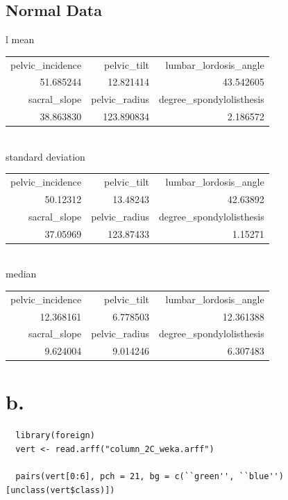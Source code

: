 \documentclass{report}
\begin{document}
\subsection{Normal Data}

\begin{tabular}{l}
  mean \\
  \hskip 1.0cm\begin{tabular}{rrr}
    pelvic\_incidence & pelvic\_tilt & lumbar\_lordosis\_angle \\
    51.685244 & 12.821414 & 43.542605 \\
    sacral\_slope & pelvic\_radius & degree\_spondylolisthesis \\
    38.863830 & 123.890834 & 2.186572 \\
  \end{tabular} \\
  standard deviation \\
  \hskip 1.0cm\begin{tabular}{rrr}
    pelvic\_incidence & pelvic\_tilt & lumbar\_lordosis\_angle \\
    50.12312 & 13.48243 & 42.63892 \\
    sacral\_slope & pelvic\_radius & degree\_spondylolisthesis \\
    37.05969 & 123.87433 & 1.15271 \\
  \end{tabular} \\
  median \\
  \hskip 1.0cm\begin{tabular}{rrr}
    pelvic\_incidence & pelvic\_tilt & lumbar\_lordosis\_angle \\
    12.368161 & 6.778503 & 12.361388 \\
    sacral\_slope & pelvic\_radius & degree\_spondylolisthesis \\
    9.624004 & 9.014246 & 6.307483 \\
  \end{tabular}
\end{tabular}

\section{b.}

\begin{verbatim}
  library(foreign)
  vert <- read.arff("column_2C_weka.arff")

  pairs(vert[0:6], pch = 21, bg = c(``green'', ``blue'')[unclass(vert$class)])
\end{verbatim}
\end{document}
